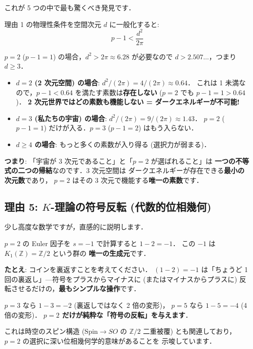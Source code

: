 \documentclass[11pt,a4paper]{article}
\begin{document}
これが 5 つの中で最も驚くべき発見です．

理由 1 の物理性条件を空間次元 $d$ に一般化すると:
\begin{equation*}
p - 1 < \frac{d^2}{2\pi}
\end{equation*}

$p = 2$ ($p - 1 = 1$) の場合，$d^2 > 2\pi \approx 6.28$ が必要なので
$d > 2.507\ldots$，つまり $d \geq 3$．

\begin{tcolorbox}[colback=red!5,colframe=red!60!black,title=$\bigstar$ 3 次元空間と $p = 2$ は同じコインの表と裏!]
\begin{itemize}
\item \textbf{$d = 2$ (2 次元空間) の場合}: $d^2/(2\pi) = 4/(2\pi) \approx 0.64$．
  これは 1 未満なので，$p - 1 < 0.64$ を満たす素数は\textbf{存在しない}
  ($p = 2$ でも $p - 1 = 1 > 0.64$)．
  \textbf{2 次元世界ではどの素数も機能しない = ダークエネルギーが不可能!}
\item \textbf{$d = 3$ (私たちの宇宙) の場合}: $d^2/(2\pi) = 9/(2\pi) \approx 1.43$．
  $p = 2$ ($p - 1 = 1$) だけが入る．$p = 3$ ($p - 1 = 2$) はもう入らない．
\item \textbf{$d \geq 4$ の場合}: もっと多くの素数が入り得る (選択力が弱まる)．
\end{itemize}

\textbf{つまり}: 「宇宙が 3 次元であること」と「$p = 2$ が選ばれること」は
\textbf{一つの不等式の二つの帰結}なのです．3 次元空間は
ダークエネルギーが存在できる\textbf{最小の次元数}であり，
$p = 2$ はその 3 次元で機能する\textbf{唯一の素数}です．
\end{tcolorbox}

\subsection{理由 5: $K$-理論の符号反転 (代数的位相幾何)}

少し高度な数学ですが，直感的に説明します．

$p = 2$ の Euler 因子を $s = -1$ で計算すると $1 - 2 = -1$．
この $-1$ は $K_1(\mathbb{Z}) = \mathbb{Z}/2$ という群の
\textbf{唯一の生成元}です．

\begin{tcolorbox}[colback=purple!5,colframe=purple!50!black]
\textbf{たとえ}: コインを裏返すことを考えてください．
$(1 - 2) = -1$ は「ちょうど 1 回の裏返し」---符号をプラスからマイナスに
(またはマイナスからプラスに) 反転させるだけの，\textbf{最もシンプルな操作}です．

$p = 3$ なら $1 - 3 = -2$ (裏返しではなく 2 倍の変形)，
$p = 5$ なら $1 - 5 = -4$ (4 倍の変形)．
\textbf{$p = 2$ だけが純粋な「符号の反転」を与えます}．

これは時空のスピン構造 ($\text{Spin} \to SO$ の $\mathbb{Z}/2$ 二重被覆)
とも関連しており，$p = 2$ の選択に深い位相幾何学的意味があることを
示唆しています．
\end{tcolorbox}
\end{document}
